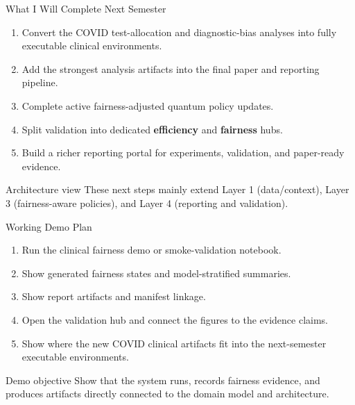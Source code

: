 \documentclass[aspectratio=169,10pt]{beamer}
\begin{document}
\begin{frame}{What I Will Complete Next Semester}
\begin{enumerate}
    \item Convert the COVID test-allocation and diagnostic-bias analyses into fully executable clinical environments.
    \item Add the strongest analysis artifacts into the final paper and reporting pipeline.
    \item Complete active fairness-adjusted quantum policy updates.
    \item Split validation into dedicated \textbf{efficiency} and \textbf{fairness} hubs.
    \item Build a richer reporting portal for experiments, validation, and paper-ready evidence.
\end{enumerate}
\vspace{0.5em}
\begin{block}{Architecture view}
These next steps mainly extend Layer 1 (data/context), Layer 3 (fairness-aware policies), and Layer 4 (reporting and validation).
\end{block}
\end{frame}

\begin{frame}{Working Demo Plan}
\begin{enumerate}
    \item Run the clinical fairness demo or smoke-validation notebook.
    \item Show generated fairness states and model-stratified summaries.
    \item Show report artifacts and manifest linkage.
    \item Open the validation hub and connect the figures to the evidence claims.
    \item Show where the new COVID clinical artifacts fit into the next-semester executable environments.
\end{enumerate}
\vspace{0.5em}
\begin{block}{Demo objective}
Show that the system runs, records fairness evidence, and produces artifacts directly connected to the domain model and architecture.
\end{block}
\end{frame}
\end{document}
